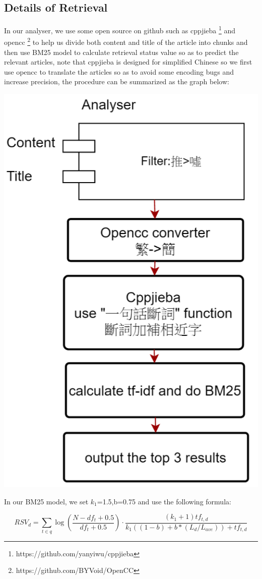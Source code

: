 \documentclass[a4paper, 10pt,twocolumn]{article} %
\begin{document}
\subsection{\label{sec:level3} Details of Retrieval}
In our analyser, we use some open source on github such as cppjieba \footnote{https://github.com/yanyiwu/cppjieba} and opencc \footnote{https://github.com/BYVoid/OpenCC} to help us divide both content and title of the article into chunks and then use BM25 model to calculate retrieval status value so as to predict the relevant articles, note that cppjieba is designed for simplified Chinese so we first use opencc to translate the articles so as to avoid some encoding bugs and increase precision, the procedure can be summarized as the graph below: 
\begin{center}
\includegraphics[scale=0.55]{retrieval.png}
\end{center}
In our BM25 model, we set $k_1$=1.5,b=0.75 and use the following formula:
\begin{footnotesize}
$$RSV_d=\sum_{t\in q}\log(\frac{N-df_t+0.5}{df_t+0.5})\cdot\frac{(k_1+1)tf_{t,d}}{k_1((1-b)+b*(L_d/L_{ave}))+tf_{t,d}}$$
\end{footnotesize}
\end{document}
